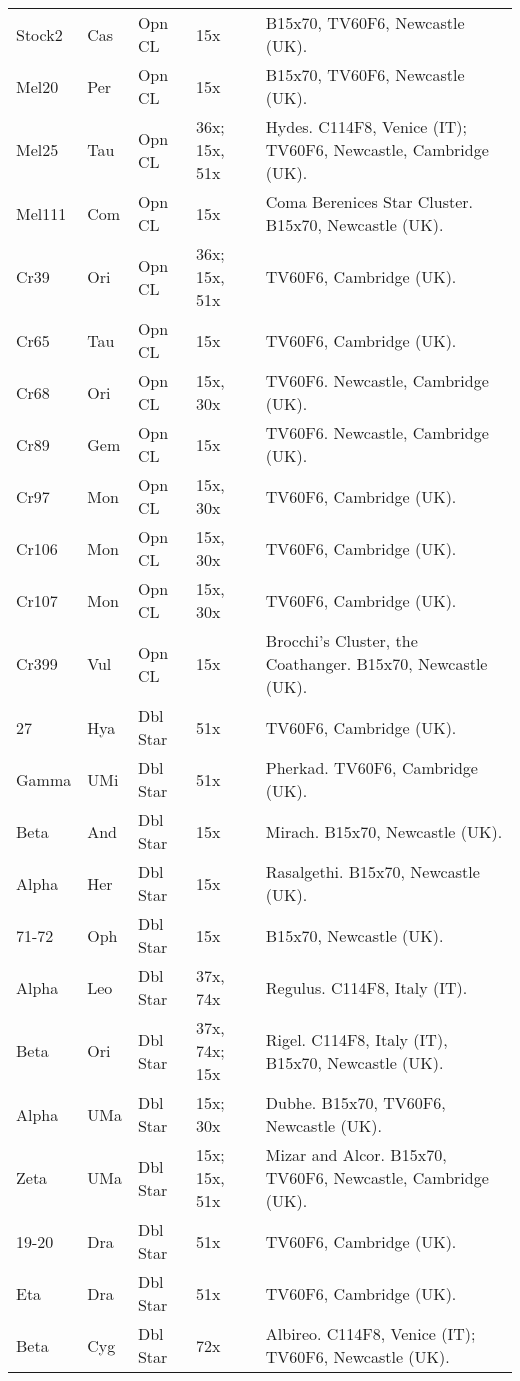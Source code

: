 \begin{longtable}{ p{0.7in}  p{0.3in}  p{0.6in}  p{0.9in}  p{5.8in} }
Stock2 & Cas & Opn CL & 15x & B15x70, TV60F6, Newcastle (UK). \\ 
Mel20 & Per & Opn CL & 15x & B15x70, TV60F6, Newcastle (UK). \\ 
Mel25 & Tau & Opn CL & 36x; 15x, 51x & Hydes. C114F8, Venice (IT); TV60F6, Newcastle, Cambridge (UK). \\ 
Mel111 & Com & Opn CL & 15x & Coma Berenices Star Cluster. B15x70, Newcastle (UK). \\ 
Cr39 & Ori & Opn CL & 36x; 15x, 51x & TV60F6, Cambridge (UK). \\ 
Cr65 & Tau & Opn CL & 15x & TV60F6, Cambridge (UK). \\ 
Cr68 & Ori & Opn CL & 15x, 30x & TV60F6. Newcastle, Cambridge (UK). \\ 
Cr89 & Gem & Opn CL & 15x & TV60F6. Newcastle, Cambridge (UK). \\ 
Cr97 & Mon & Opn CL & 15x, 30x & TV60F6, Cambridge (UK). \\ 
Cr106 & Mon & Opn CL & 15x, 30x & TV60F6, Cambridge (UK). \\ 
Cr107 & Mon & Opn CL & 15x, 30x & TV60F6, Cambridge (UK). \\ 
Cr399 & Vul & Opn CL & 15x & Brocchi's Cluster, the Coathanger. B15x70, Newcastle (UK). \\ 
27 & Hya & Dbl Star & 51x & TV60F6, Cambridge (UK). \\ 
Gamma & UMi & Dbl Star & 51x & Pherkad. TV60F6, Cambridge (UK). \\ 
Beta & And & Dbl Star & 15x & Mirach. B15x70, Newcastle (UK). \\ 
Alpha & Her & Dbl Star & 15x & Rasalgethi. B15x70, Newcastle (UK). \\ 
71-72 & Oph & Dbl Star & 15x & B15x70, Newcastle (UK). \\ 
Alpha & Leo & Dbl Star & 37x, 74x & Regulus. C114F8, Italy (IT). \\ 
Beta & Ori & Dbl Star & 37x, 74x; 15x & Rigel. C114F8, Italy (IT), B15x70, Newcastle (UK). \\ 
Alpha & UMa & Dbl Star & 15x; 30x & Dubhe. B15x70, TV60F6, Newcastle (UK). \\ 
Zeta & UMa & Dbl Star & 15x; 15x, 51x & Mizar and Alcor. B15x70, TV60F6, Newcastle, Cambridge (UK). \\ 
19-20 & Dra & Dbl Star & 51x & TV60F6, Cambridge (UK). \\ 
Eta & Dra & Dbl Star & 51x & TV60F6, Cambridge (UK). \\ 
Beta & Cyg & Dbl Star & 72x & Albireo. C114F8, Venice (IT); TV60F6, Newcastle (UK). \\ 

\end{longtable}
